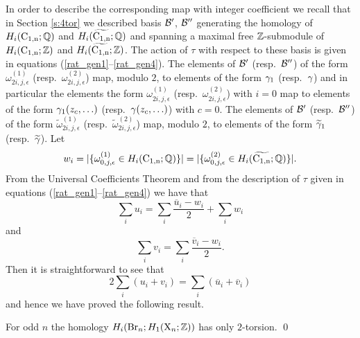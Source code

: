 In order to describe the corresponding map with integer coefficient we recall that in Section \ref{s:4tor} we described basis
 $\mathcal{B}'$, $\mathcal{B}''$ generating the homology of $H_i(\operatorname{C_{1,n}};{\mathbb{Q}}) $ and $H_i(\widetilde{\operatorname{C_{1,n}}};{\mathbb{Q}})$ and spanning a maximal free $\mathbb{Z}$-submodule of $H_i(\operatorname{C_{1,n}};\mathbb{Z}) $ and $H_i(\widetilde{\operatorname{C_{1,n}}};\mathbb{Z})$. The action of $\tau$ with respect to these basis is given in equations (\ref{rat_gen1}--\ref{rat_gen4}). The elements of $\mathcal{B}'$ (resp.~$\mathcal{B}''$) of the form $\omega_{2i,j,\epsilon}^{(1)}$ (resp.~$\omega_{2i,j,\epsilon}^{(2)}$) map, modulo $2$, to elements of the form $\operatorname{\gamma_1}$ (resp.~$\operatorname{\gamma}$) and in particular the elements the form $\omega_{2i,j,\epsilon}^{(1)}$ (resp.~$\omega_{2i,j,\epsilon}^{(2)}$) with $i=0$ map to elements of the form $\operatorname{\gamma_1}(z_c, \ldots)$ (resp.~$\operatorname{\gamma}(z_c, \ldots)$) with $c=0$.
The elements of $\mathcal{B}'$ (resp.~$\mathcal{B}''$) of the form $\widetilde{\omega}_{2i,j,\epsilon}^{(1)}$ (resp.~$\widetilde{\omega}_{2i,j,\epsilon}^{(2)}$) map, modulo $2$, to elements of the form $\widetilde{\gamma}_1$ (resp.~$\widetilde{\gamma}$).
Let $$w_i = | \{ \omega_{0,j,\epsilon}^{(1)} \in H_i(\operatorname{C_{1,n}};{\mathbb{Q}})\} | = 
| \{ \omega_{0,j,\epsilon}^{(2)} \in H_i(\widetilde{\operatorname{C_{1,n}}};{\mathbb{Q}})\} |.
$$
From the Universal Coefficients Theorem and from the description of $\tau$ given in equations (\ref{rat_gen1}--\ref{rat_gen4}) we have that
$$
\sum_i u_i = \sum_i  \frac{ \overline{u}_i - w_i}{2} +\sum_i  w_i
$$
and
$$
\sum_i v_i =  \sum_i  \frac{\overline{v}_i - w_i}{2}.
$$
Then it is straightforward to see that 
$$2 \sum_i (u_i + v_i) = \sum_i (\overline{u}_i  + \overline{v}_i ) $$
and hence we have proved the following result.
\begin{thm} \label{th:no4tor}
For odd $n$ the homology $H_{i}(\operatorname{Br}_n; H_1(\mathrm{X}_n;\mathbb{Z}))$ has only $2$-torsion. \qed
\end{thm}



